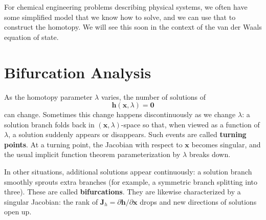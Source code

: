 For chemical engineering problems describing physical systems, we often have some simplified model that we know how to solve, and we can use that to construct the homotopy. We will see this soon in the context of the van der Waals equation of state.

\section{Bifurcation Analysis}
As the homotopy parameter $\lambda$ varies, the number of solutions of
\[
\mathbf{h}(\mathbf{x},\lambda)=\mathbf{0}
\]
can change. Sometimes this change happens discontinuously as we change $\lambda$: a solution branch folds back in $(\mathbf{x},\lambda)$-space so that, when viewed as a function of $\lambda$, a solution suddenly appears or disappears. Such events are called \textbf{turning points}. At a turning point, the Jacobian with respect to $\mathbf{x}$ becomes singular, and the usual implicit function theorem parameterization by $\lambda$ breaks down.

In other situations, additional solutions appear continuously: a solution branch smoothly sprouts extra branches (for example, a symmetric branch splitting into three). These are called \textbf{bifurcations}. They are likewise characterized by a singular Jacobian: the rank of $\mathbf{J}_h=\partial \mathbf{h}/\partial \mathbf{x}$ drops and new directions of solutions open up.


